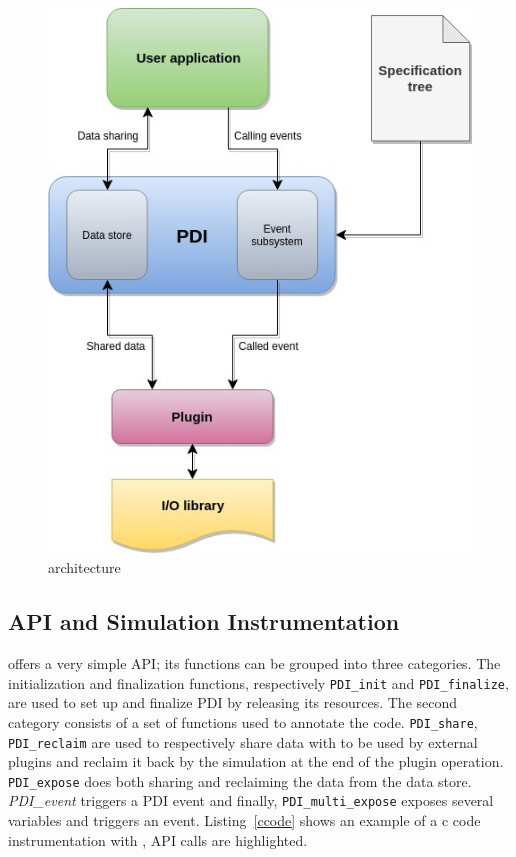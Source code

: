 \begin{figure}[h!]\centering
\includegraphics[scale=0.5]{figures/PDI_schema.jpg}
\caption{\pdi architecture\cite{PDI}}
\label{figpdiarchi}
\end{figure}

\subsection{\pdi API and Simulation Instrumentation}
\pdi offers a very simple API; its functions can be grouped into three categories. The initialization and finalization functions, respectively \texttt{PDI\_init} and \texttt{PDI\_finalize}, are used to set up and finalize PDI by releasing its resources. 
The second category consists of a set of functions used to annotate the code. \texttt{PDI\_share}, \texttt{PDI\_reclaim} are used to respectively share data with \pdi to be used by external plugins and reclaim it back by the simulation at the end of the plugin operation. \texttt{PDI\_expose} does both sharing and reclaiming the data from the data store. \textit{PDI\_event} triggers a PDI event and finally, \texttt{PDI\_multi\_expose} exposes several variables and triggers an event. Listing~\ref{ccode} shows an example of a c code instrumentation with \pdi, \pdi API calls are highlighted.

